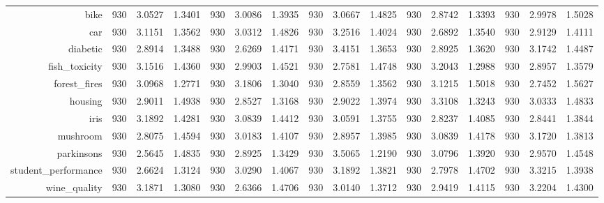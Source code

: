 \begin{table}[htbp]
{\begin{tabular}{rccccccccccccccc}
    bike  & 930   & 3.0527 & 1.3401 & 930   & 3.0086 & 1.3935 & 930   & 3.0667 & 1.4825 & 930   & \cellcolor[rgb]{ .776,  .937,  .808}\textcolor[rgb]{ 0,  .38,  0}{2.8742} & 1.3393 & 930   & 2.9978 & 1.5028 \\
    car   & 930   & 3.1151 & 1.3562 & 930   & 3.0312 & 1.4826 & 930   & 3.2516 & 1.4024 & 930   & \cellcolor[rgb]{ .776,  .937,  .808}\textcolor[rgb]{ 0,  .38,  0}{2.6892} & 1.3540 & 930   & 2.9129 & 1.4111 \\
    diabetic & 930   & 2.8914 & 1.3488 & 930   & \cellcolor[rgb]{ .776,  .937,  .808}\textcolor[rgb]{ 0,  .38,  0}{2.6269} & 1.4171 & 930   & 3.4151 & 1.3653 & 930   & 2.8925 & 1.3620 & 930   & 3.1742 & 1.4487 \\
    fish\_toxicity & 930   & 3.1516 & 1.4360 & 930   & 2.9903 & 1.4521 & 930   & \cellcolor[rgb]{ .776,  .937,  .808}\textcolor[rgb]{ 0,  .38,  0}{2.7581} & 1.4748 & 930   & 3.2043 & 1.2988 & 930   & 2.8957 & 1.3579 \\
    forest\_fires & 930   & 3.0968 & 1.2771 & 930   & 3.1806 & 1.3040 & 930   & 2.8559 & 1.3562 & 930   & 3.1215 & 1.5018 & 930   & \cellcolor[rgb]{ .776,  .937,  .808}\textcolor[rgb]{ 0,  .38,  0}{2.7452} & 1.5627 \\
    housing & 930   & 2.9011 & 1.4938 & 930   & \cellcolor[rgb]{ .776,  .937,  .808}\textcolor[rgb]{ 0,  .38,  0}{2.8527} & 1.3168 & 930   & 2.9022 & 1.3974 & 930   & 3.3108 & 1.3243 & 930   & 3.0333 & 1.4833 \\
    iris  & 930   & 3.1892 & 1.4281 & 930   & 3.0839 & 1.4412 & 930   & 3.0591 & 1.3755 & 930   & \cellcolor[rgb]{ .776,  .937,  .808}\textcolor[rgb]{ 0,  .38,  0}{2.8237} & 1.4085 & 930   & 2.8441 & 1.3844 \\
    mushroom & 930   & \cellcolor[rgb]{ .776,  .937,  .808}\textcolor[rgb]{ 0,  .38,  0}{2.8075} & 1.4594 & 930   & 3.0183 & 1.4107 & 930   & 2.8957 & 1.3985 & 930   & 3.0839 & 1.4178 & 930   & 3.1720 & 1.3813 \\
    parkinsons & 930   & \cellcolor[rgb]{ .776,  .937,  .808}\textcolor[rgb]{ 0,  .38,  0}{2.5645} & 1.4835 & 930   & 2.8925 & 1.3429 & 930   & 3.5065 & 1.2190 & 930   & 3.0796 & 1.3920 & 930   & 2.9570 & 1.4548 \\
    student\_performance & 930   & \cellcolor[rgb]{ .776,  .937,  .808}\textcolor[rgb]{ 0,  .38,  0}{2.6624} & 1.3124 & 930   & 3.0290 & 1.4067 & 930   & 3.1892 & 1.3821 & 930   & 2.7978 & 1.4702 & 930   & 3.3215 & 1.3938 \\
    wine\_quality & 930   & 3.1871 & 1.3080 & 930   & \cellcolor[rgb]{ .776,  .937,  .808}\textcolor[rgb]{ 0,  .38,  0}{2.6366} & 1.4706 & 930   & 3.0140 & 1.3712 & 930   & 2.9419 & 1.4115 & 930   & 3.2204 & 1.4300 \\

\end{tabular}}
\end{table}
